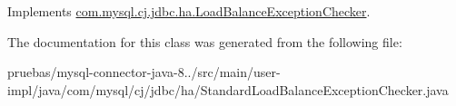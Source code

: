 Implements \mbox{\hyperlink{interfacecom_1_1mysql_1_1cj_1_1jdbc_1_1ha_1_1_load_balance_exception_checker_a5d8bf713d492a85c62b52278437c4e60}{com.\+mysql.\+cj.\+jdbc.\+ha.\+Load\+Balance\+Exception\+Checker}}.



The documentation for this class was generated from the following file\+:\begin{DoxyCompactItemize}
\item 
pruebas/mysql-\/connector-\/java-\/8../src/main/user-\/impl/java/com/mysql/cj/jdbc/ha/Standard\+Load\+Balance\+Exception\+Checker.\+java\end{DoxyCompactItemize}
